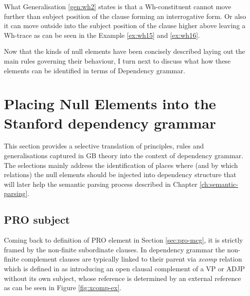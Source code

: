 What Generalisation \ref{gen:wh2} states is that a Wh-constituent cannot move further than subject position of the clause forming an interrogative form. Or also it can move outside into the subject position of the clause higher above leaving a Wh-trace as can be seen in the Example \ref{ex:wh15} and \ref{ex:wh16}.

Now that the kinds of null elements have been concisely described laying out the main rules governing their behaviour, I turn next to discuss what how these elements can be identified in terms of Dependency grammar. 

\section{Placing Null Elements into the Stanford dependency grammar}
\label{sec:placing-null-elements}

This section provides a selective translation of principles, rules and generalisations captured in GB theory into the context of dependency grammar. The selections mainly address the identification of places where (and by which relations) the null elements should be injected into dependency structure that will later help the semantic parsing process described in Chapter \ref{ch:semantic-parsing}. 

\subsection{PRO subject}
Coming back to definition of PRO element in Section \ref{sec:pro-mcg}, it is strictly framed by the non-finite subordinate clauses. In dependency grammar the non-finite complement clauses are typically linked to their parent via \textit{xcomp} relation which is defined in \cite{Marneffe2008} as introducing an open clausal complement of a VP or ADJP without its own subject, whose reference is determined by an external reference as can be seen in Figure \ref{fig:xcomp-ex}.


